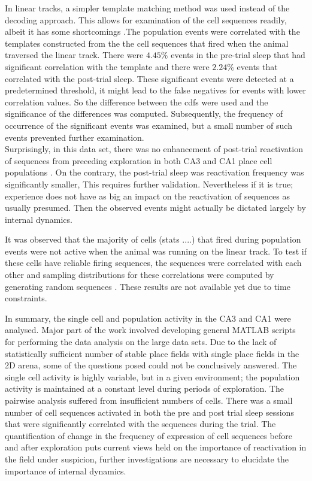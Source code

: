 In linear tracks, a simpler template matching method was used instead of the decoding approach. This allows for examination of the cell sequences readily, albeit it has some shortcomings \cite{Tatsuno2006}.The population events were correlated with the templates constructed from the the cell sequences that fired when the animal traversed the linear track. There were $4.45 \% $ events in the pre-trial sleep that had significant correlation with the template and there were $ 2.24 \% $  events that correlated with the post-trial sleep. These significant events were detected at a predetermined threshold, it might lead to the false negatives for events with lower correlation values. So the difference between the cdfs were used and the significance of the differences was computed. Subsequently, the frequency of occurrence of the significant events was examined, but a small number of such events prevented further examination.\\ 
Surprisingly, in this data set, there was no enhancement of post-trial reactivation of sequences from preceding exploration in both CA3 and CA1 place cell populations \cite{Lee2002}. On the contrary, the post-trial sleep was reactivation frequency was significantly smaller, This requires further validation. Nevertheless if it is true; experience does not have as big an impact on the reactivation of sequences as usually presumed. Then the observed events might actually be dictated largely by internal dynamics. 

It was observed that the majority of cells (stats ....) that fired during population events were not active when the animal was running on the linear track. To test if these cells have reliable firing sequences, the sequences were correlated with each other and sampling distributions for these correlations were computed by generating random sequences \cite{Nadasdy1999}. These results are not available yet due to time constraints. 

In summary, the single cell and population activity in the CA3 and CA1 were analysed. Major part of the work involved developing general MATLAB scripts for performing the data analysis on the large data sets. Due to the lack of statistically sufficient number of stable place fields with single place fields in the 2D arena, some of the questions posed could not be conclusively answered. The single cell activity is highly variable, but in a given environment; the population activity is maintained at a constant level during periods of exploration. The pairwise analysis suffered from insufficient numbers of cells. There was a small number of cell sequences activated in both the pre and post trial sleep sessions that were significantly correlated with the sequences during the trial. The quantification of change in the frequency of expression of cell sequences before and after exploration puts current views held on the importance of reactivation in the field under suspicion, further investigations are necessary to elucidate the importance of internal dynamics. 






